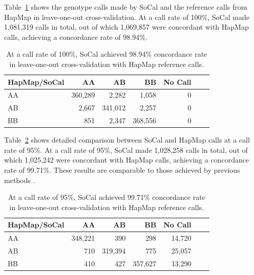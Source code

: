 \documentclass{scrartcl}
\begin{document}
\par
Table~\ref{table:cmp_hapmap_socal_100} shows the genotype calls made by SoCal
and the reference calls from HapMap in leave-one-out cross-validation.
At a call rate of 100\%, SoCal made 1,081,319 calls in total, out of which
1,069,857 were concordant with HapMap calls, achieving a concordance
rate of 98.94\%.

\begin{table}[H]
\centering
\begin{tabular}{l*{5}{r}r}
    \hline
    HapMap/SoCal  & AA       & AB      & BB      & No Call \\ \hline
    AA            & 360,289  & 2,282   & 1,058   & 0  \\
    AB            & 2,667    & 341,012 & 2,257   & 0  \\
    BB            & 851      & 2,347   & 368,556 & 0  \\ \hline
\end{tabular}
\caption{At a call rate of 100\%, SoCal achieved 98.94\% concordance rate
in leave-one-out cross-validation with HapMap reference calls.}
\label{table:cmp_hapmap_socal_100}
\end{table}

\par
Table~\ref{table:cmp_hapmap_socal_95} shows detailed comparison between
SoCal and HapMap calls at a call rate of 95\%.
At a call rate of 95\%, SoCal made 1,028,258 calls in total, out of which
1,025,242 were concordant with HapMap calls, achieving a concordance
rate of 99.71\%.
These results are comparable to those achieved by previous methods
\cite{rabbee2005,di2005}.

\begin{table}[H]
\centering
\begin{tabular}{l*{5}{r}r}
    \hline
    HapMap/SoCal  & AA       & AB      & BB      & No Call \\ \hline
    AA            & 348,221  & 390     & 298     & 14,720  \\
    AB            & 710      & 319,394 & 775     & 25,057  \\
    BB            & 410      & 427     & 357,627 & 13,290  \\ \hline
\end{tabular}
\caption{At a call rate of 95\%, SoCal achieved 99.71\% concordance rate
in leave-one-out cross-validation with HapMap reference calls.}
\label{table:cmp_hapmap_socal_95}
\end{table}
\end{document}
